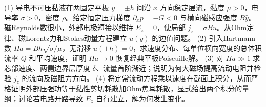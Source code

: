 (1) 导电不可压黏液在两固定平板 \(y=\pm h\) 间沿 \(x\) 方向稳定层流，黏度 \(\mu>0\)，电导率 \(\sigma>0\)，密度 \(\rho\)。给定恒定压力梯度 \(\partial_xp=-G<0\) 与横向磁感应强度 \(B\hat y\)。磁Reynolds数很小，外部电极短接以维持 \(E_z=0\)，使局部 \(j_z=\sigma Bu\)。从Ohm定律、磁Lorentz力和Stokes动量方程建立 \(u(y)\) 的边值问题。
(2) 引入Hartmann数 \(Ha=Bh\sqrt{\sigma/\mu}\)，无滑移 \(u(\pm h)=0\)，求速度分布、每单位横向宽度的总体积流率 \(Q\) 和平均速度，证明 \(Ha\to0\) 恢复经典平板Poiseuille解。
(3) 对 \(Ha\gg1\) 求芯部速度、两侧边界层厚度 \(\delta\)、流量首阶渐近；说明为何大磁场提高流动电阻并检验 \(j_z\) 的流向及磁阻力方向。
(4) 将定常流动方程乘以速度在截面上积分，从而严格证明外部压强功等于黏性剪切耗散加Ohm焦耳耗散，显式给出两个积分的量纲；讨论若电路开路导致 \(E_z\) 自行建立，解为何发生变化。
